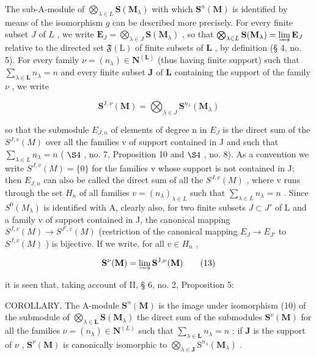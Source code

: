 The sub-A-module of \(\bigotimes_{\lambda \in L} \mathbf{S}(\mathbf{M}_{\lambda})\) with which \(\mathbf{S}^n(\mathbf{M})\) is identified by means of the isomorphism \(g\) can be described more precisely. For every finite subset \(J\) of \(L\) , we write \(\mathbf{E}_J = \bigotimes_{\lambda \in J} \mathbf{S}(\mathbf{M}_{\lambda})\) , so that \(\bigotimes_{\lambda \in L} \mathbf{S}(\mathbf{M}_{\lambda}) = \varinjlim \mathbf{E}_J\) relative to the directed set \(\mathfrak{F}(\mathrm{L})\) of finite subsets of \(\mathbf{L}\) , by definition (§ 4, no. 5). For every family \(\nu = (n_{\lambda}) \in \mathbf{N}^{(\mathbf{L})}\) (thus having finite support) such that \(\sum_{\lambda \in \mathbf{L}} n_{\lambda} = n\) and every finite subset \(\mathbf{J}\) of \(\mathbf{L}\) containing the support of the family \(\nu\) , we write

\[
\mathbf {S} ^ {\mathrm{J}, \nu} (\mathbf {M}) = \bigotimes_ {\lambda \in J} \mathbf {S} ^ {n _ {\lambda}} (\mathbf {M} _ {\lambda})\tag{12}
\]

so that the submodule \(E_{J,n}\) of elements of degree n in \(E_{J}\) is the direct sum of the \(S^{J,v}(M)\) over all the families v of support contained in J and such that \(\sum_{\lambda\in L}n_{\lambda}=n\) ( \(\S4\) , no. 7, Proposition 10 and \(\S4\) , no. 8). As a convention we write \(S^{J,v}(M)=\{0\}\) for the families v whose support is not contained in J; then \(E_{J,n}\) can also be called the direct sum of all the \(S^{J,v}(M)\) , where v runs through the set \(H_{n}\) of all families \(v=(n_{\lambda})_{\lambda\in L}\) such that \(\sum_{\lambda\in L}n_{\lambda}=n\) . Since \(S^{0}(M_{\lambda})\) is identified with A, clearly also, for two finite subsets \(J\subset J'\) of L and a family v of support contained in J, the canonical mapping \(S^{J,v}(M)\to S^{J',v}(M)\) (restriction of the canonical mapping \(E_{J}\to E_{J'}\) to \(S^{J,v}(M)\) ) is bijective. If we write, for all \(v\in H_{n}\) ,

\[
\mathbf {S} ^ {\nu} (\mathbf {M}) = \varinjlim \mathbf {S} ^ {\mathrm{J}, \nu} (\mathbf {M})\tag{13}
\]

it is seen that, taking account of II, § 6, no. 2, Proposition 5:

COROLLARY. The A-module \(\mathbf{S}^n (\mathbf{M})\) is the image under isomorphism (10) of the submodule of \(\bigotimes_{\lambda \in \mathbf{L}}\mathbf{S}(\mathbf{M}_{\lambda})\) the direct sum of the submodules \(\mathbf{S}^{\nu}(\mathbf{M})\) for all the families \(\nu = (n_{\lambda})\in \mathbf{N}^{(L)}\) such that \(\sum_{\lambda \in \mathbf{L}}n_{\lambda} = n\) ; if \(\mathbf{J}\) is the support of \(\nu\) , \(\mathbf{S}^{\nu}(\mathbf{M})\) is canonically isomorphic to \(\bigotimes_{\lambda \in \mathbf{J}}\mathrm{S}^{n_{\lambda}}(\mathbf{M}_{\lambda})\) .

